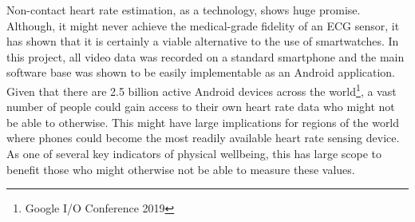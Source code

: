 

Non-contact heart rate estimation, as a technology, shows huge promise. Although, it might never achieve the medical-grade 
fidelity of an ECG sensor, it has shown that it is certainly a viable alternative to the use of smartwatches. In this project, all video data was 
recorded on a standard smartphone and the main software base was shown to be easily implementable as an Android application.
Given that there are 2.5 billion active Android devices across the world\footnote{Google I/O Conference 2019}, a vast number of people could gain access
to their own heart rate data who might not be able to otherwise. This might have large implications
for regions of the world where phones could become the most readily available heart rate sensing device. 
As one of several key indicators of physical wellbeing, this has large scope to benefit those who might otherwise not be able to measure these values.


